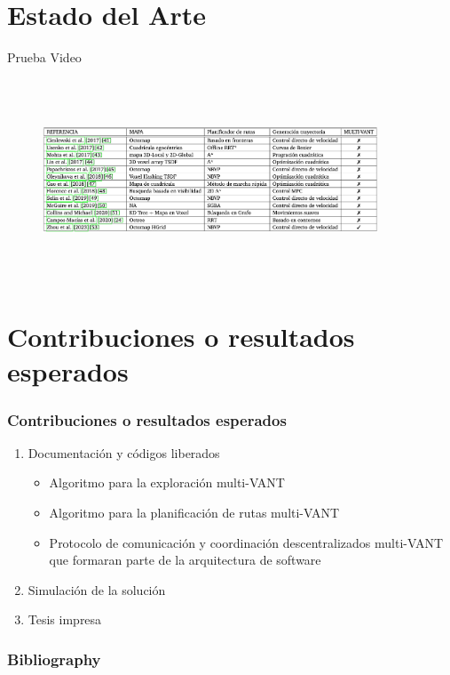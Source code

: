\documentclass[
	12pt, %
	aspectratio=169, %
]{beamer}
\begin{document}
\section{Estado del Arte}

\begin{frame}{Prueba Video}

  \centering
\end{frame}


\begin{frame}
\begin{figure}
  \centering
  \includegraphics[width=10cm, height=6cm]{estado_del_arte}
\end{figure}
\end{frame}

\section{Contribuciones o resultados esperados}

\begin{frame}

  \frametitle{Contribuciones o resultados esperados}

  \begin{enumerate}
  \item<1-> Documentación y códigos liberados
    \begin{itemize}
    \item Algoritmo para la exploración multi-VANT
    \item Algoritmo para la planificación de rutas multi-VANT
    \item Protocolo de comunicación y coordinación descentralizados multi-VANT que formaran parte de la arquitectura de software
    \end{itemize}
  \item<2-> Simulación de la solución
  \item<3-> Tesis impresa
  \end{enumerate}
  
\end{frame}

\begin{frame}
  \frametitle{Bibliography}
  
  
\end{frame}
\end{document}
